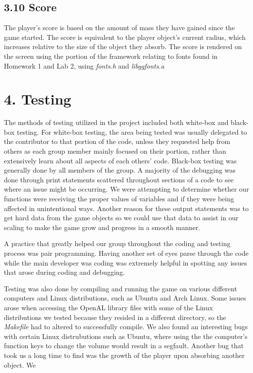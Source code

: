 \documentclass[12pt]{report}
\begin{document}
\newpage
\subsection*{3.10 Score}
The player's score is based on the amount of mass they have gained since the game started. The score is equivalent to the player object's current radius, which increases relative to the size of the object they absorb. The score is rendered on the screen using the portion of the framework relating to fonts found in Homework 1 and Lab 2, using \textit{fonts.h} and \textit{libggfonts.a} \bigskip

\newpage
\section*{4. Testing}

The methods of testing utilized in the project included both white-box and black-box testing. For white-box testing, the area being tested was usually delegated to the contributor to that portion of the code, unless they requested help from others as each group member mainly focused on their portion, rather than extensively learn about all aspects of each others' code. Black-box testing was generally done by all members of the group. A majority of the debugging was done through print statements scattered throughout sections of a code to see where an issue might be occurring. We were attempting to determine whether our functions were receiving the proper values of variables and if they were being affected in unintentional ways. Another reason for these output statements was to get hard data from the game objects so we could use that data to assist in our scaling to make the game grow and progress in a smooth manner. \bigskip

A practice that greatly helped our group throughout the coding and testing process was pair programming. Having another set of eyes parse through the code while the main developer was coding was extremely helpful in spotting any issues that arose during coding and debugging. \bigskip

Testing was also done by compiling and running the game on various different computers and Linux distributions, such as Ubuntu and Arch Linux. Some issues arose when accessing the OpenAL library files with some of the Linux distributions we tested because they resided in a different directory, so the \textit{Makefile} had to altered to successfully compile. We also found an interesting bugs with certain Linux distrubutions such as Ubuntu, where using the the computer's function keys to change the volume would result in a segfault. Another bug that took us a long time to find was the growth of the player upon absorbing another object. We 
\end{document}
